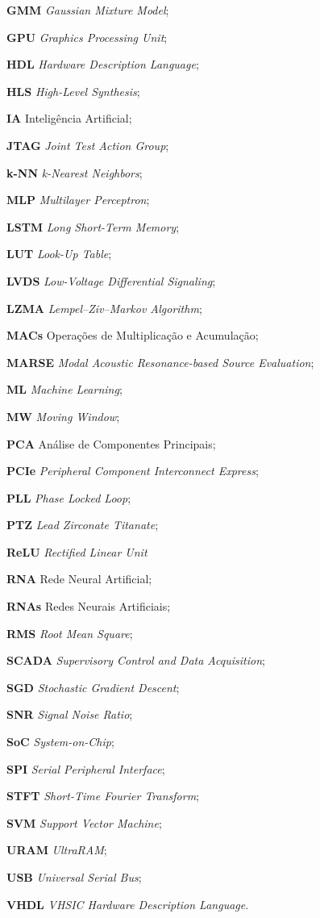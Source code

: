 \documentclass[
	12pt,				%
	oneside,
	a4paper,			%
	english,			%
	french,				%
	spanish,			%
	brazil				%
	]{abntex2}
\begin{document}
\begin{siglas}
	\item[\textbf{GMM}] \textit{Gaussian Mixture Model};
	\item[\textbf{GPU}] \textit{Graphics Processing Unit};
	\item[\textbf{HDL}] \textit{Hardware Description Language};
	\item[\textbf{HLS}] \textit{High-Level Synthesis};
	\item[\textbf{IA}] Inteligência Artificial;
	\item[\textbf{JTAG}] \textit{Joint Test Action Group};
	\item[\textbf{k-NN}] \textit{k-Nearest Neighbors};
	\item[\textbf{MLP}] \textit{Multilayer Perceptron};
	\item[\textbf{LSTM}] \textit{Long Short-Term Memory};
	\item[\textbf{LUT}] \textit{Look-Up Table};
	\item[\textbf{LVDS}] \textit{Low-Voltage Differential Signaling};
	\item[\textbf{LZMA}] \textit{Lempel–Ziv–Markov Algorithm};
	\item[\textbf{MACs}] Operações de Multiplicação e Acumulação;
	\item[\textbf{MARSE}] \textit{Modal Acoustic Resonance-based Source Evaluation};
	\item[\textbf{ML}] \textit{Machine Learning};
	\item[\textbf{MW}] \textit{Moving Window};
	\item[\textbf{PCA}] Análise de Componentes Principais;
	\item[\textbf{PCIe}] \textit{Peripheral Component Interconnect Express};
	\item[\textbf{PLL}] \textit{Phase Locked Loop};
	\item[\textbf{PTZ}] \textit{Lead Zirconate Titanate};
	\item[\textbf{ReLU}] \textit{Rectified Linear Unit}
	\item[\textbf{RNA}] Rede Neural Artificial;
	\item[\textbf{RNAs}] Redes Neurais Artificiais;
	\item[\textbf{RMS}] \textit{Root Mean Square};
	\item[\textbf{SCADA}] \textit{Supervisory Control and Data Acquisition};
	\item[\textbf{SGD}] \textit{Stochastic Gradient Descent};
	\item[\textbf{SNR}] \textit{Signal Noise Ratio};
	\item[\textbf{SoC}] \textit{System-on-Chip};
	\item[\textbf{SPI}] \textit{Serial Peripheral Interface};
	\item[\textbf{STFT}] \textit{Short-Time Fourier Transform};
	\item[\textbf{SVM}] \textit{Support Vector Machine};
	\item[\textbf{URAM}] \textit{UltraRAM};
	\item[\textbf{USB}] \textit{Universal Serial Bus};
	\item[\textbf{VHDL}] \textit{VHSIC Hardware Description Language}.
\end{siglas}
\end{document}
